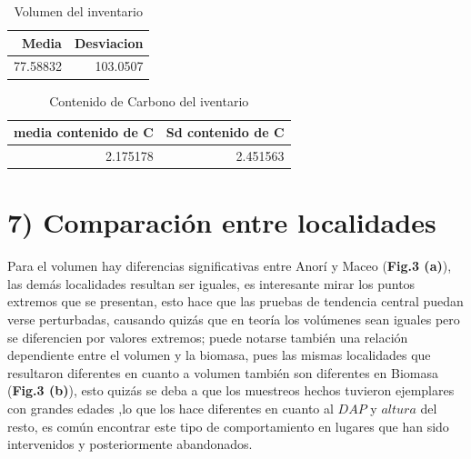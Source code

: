 \documentclass[9pt,onecolumn,twoside,]{pinp}
\begin{document}
\begin{table}

\caption{\label{tab:unnamed-chunk-29}Volumen del inventario}
\centering
\begin{tabular}[t]{r|r}
\hline
Media & Desviacion\\
\hline
77.58832 & 103.0507\\
\hline
\end{tabular}
\end{table}

\begin{table}

\caption{\label{tab:unnamed-chunk-30}Contenido de Carbono del iventario}
\centering
\begin{tabular}[t]{r|r}
\hline
media contenido de C & Sd contenido de C\\
\hline
2.175178 & 2.451563\\
\hline
\end{tabular}
\end{table}

\hypertarget{comparaciuxf3n-entre-localidades}{%
\section{7) Comparación entre
localidades}\label{comparaciuxf3n-entre-localidades}}

Para el volumen hay diferencias significativas entre Anorí y Maceo
(\textbf{Fig.3 (a)}), las demás localidades resultan ser iguales, es
interesante mirar los puntos extremos que se presentan, esto hace que
las pruebas de tendencia central puedan verse perturbadas, causando
quizás que en teoría los volúmenes sean iguales pero se diferencien por
valores extremos; puede notarse también una relación dependiente entre
el volumen y la biomasa, pues las mismas localidades que resultaron
diferentes en cuanto a volumen también son diferentes en Biomasa
(\textbf{Fig.3 (b)}), esto quizás se deba a que los muestreos hechos
tuvieron ejemplares con grandes edades ,lo que los hace diferentes en
cuanto al \(DAP\) y \(altura\) del resto, es común encontrar este tipo
de comportamiento en lugares que han sido intervenidos y posteriormente
abandonados.
\end{document}
